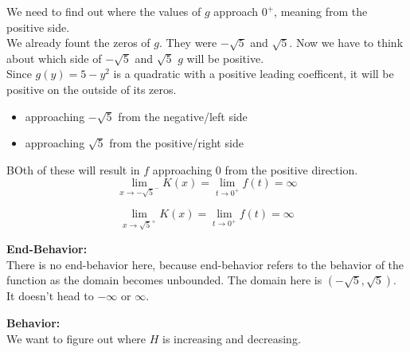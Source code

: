 \documentclass{ximera}
\begin{document}
We need to find out where the values of $g$ approach $0^+$, meaning from the positive side. \\


We already fount the zeros of $g$.  They were $-\sqrt{5}$ and $\sqrt{5}$.  Now we have to think about which side of $-\sqrt{5}$ and $\sqrt{5}$ $g$ will be positive. \\


Since $g(y) = 5 - y^2$ is a quadratic with a positive leading coefficent, it will be positive on the outside of its zeros. 

\begin{itemize}
\item approaching $-\sqrt{5}$ from the negative/left side
\item approaching $\sqrt{5}$ from the positive/right side
\end{itemize}

BOth of these will result in $f$ approaching $0$ from the positive direction. \\



\[
\lim\limits_{x \to -\sqrt{5}^-} K(x)  = \lim\limits_{t \to 0^+} f(t) = \infty
\]



\[
\lim\limits_{x \to \sqrt{5}^+} K(x)  = \lim\limits_{t \to 0^+} f(t) = \infty
\]
















\textbf{\textcolor{blue!55!black}{End-Behavior:}} \\

There is no end-behavior here, because end-behavior refers to the behavior of the function as the domain becomes unbounded.  The domain here is $(-\sqrt{5}, \sqrt{5})$. It doesn't head to $-\infty$ or $\infty$.











\textbf{\textcolor{blue!55!black}{Behavior:}} \\


We want to figure out where $H$ is increasing and decreasing. \\
\end{document}
